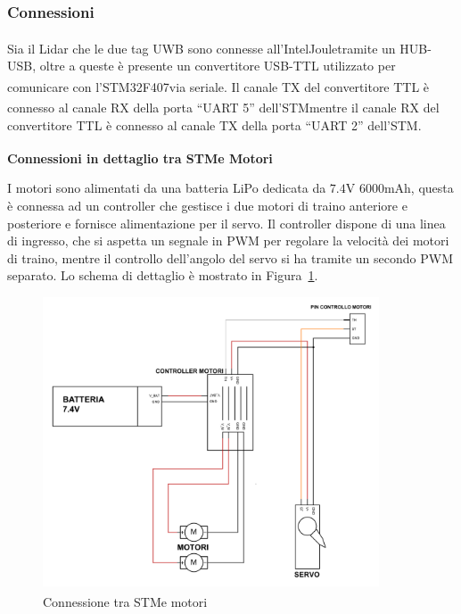 \subsubsection*{Connessioni}
\label{subsubsection1.1.1.2}

Sia il Lidar che le due tag UWB sono connesse all’Intel\textsuperscript\textregistered Joule\texttrademark\hspace{1mm}tramite un HUB-USB, oltre a queste è presente un convertitore USB-TTL utilizzato per comunicare con l’STM32F407\textsuperscript\textregistered\hspace{1mm}via seriale. 
Il canale TX del convertitore TTL è connesso al canale RX della porta “UART 5” dell’STM\textsuperscript\textregistered \hspace{1mm}mentre il canale RX del convertitore TTL è connesso al canale TX della porta “UART 2” dell’STM.

\clearpage

\null
\vfill
\textbf{Connessioni in dettaglio tra STM\textsuperscript\textregistered e Motori}

\bigskip

I motori sono alimentati da una batteria LiPo dedicata da $7.4$V $6000$mAh, questa è connessa ad un controller che gestisce i due motori di traino anteriore e posteriore e fornisce alimentazione per il servo. Il controller dispone di una linea di ingresso, che si aspetta un segnale in PWM per regolare la velocità dei motori di traino, mentre il controllo dell’angolo del servo si ha tramite un secondo PWM separato. Lo schema di dettaglio è mostrato in Figura~\ref{fig:stm_motori}.

\begin{figure}[h] 
\centering    
\includegraphics[width=0.89\textwidth]{Capitolo1/Figs/connessioni_stm_motori.pdf}
\caption[Connessioni tra STM\textsuperscript\textregistered e motori]{Connessione tra STM\textsuperscript\textregistered e motori}
\label{fig:stm_motori}
\end{figure}
\vfill

